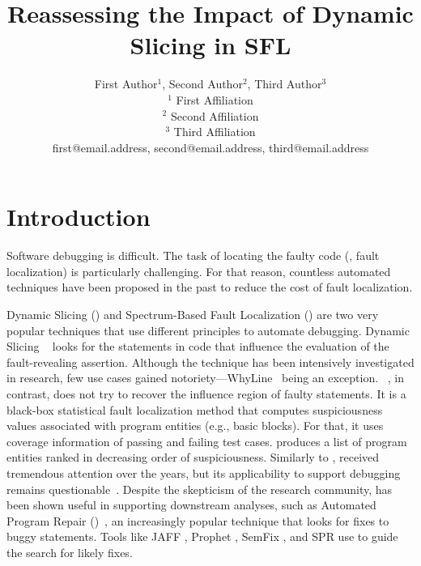\documentclass{article}
\title{Reassessing the Impact of Dynamic Slicing in SFL}
\author{
First Author$^1$,
Second Author$^2$,
Third Author$^3$
\\ 
$^1$ First Affiliation\\
$^2$ Second Affiliation\\
$^3$ Third Affiliation\\
%
first@email.address,
second@email.address,
third@email.address
}
\begin{document}
\maketitle

\begin{abstract}
\end{abstract}

\section{Introduction}


Software debugging is difficult. The task of locating the faulty code
(\ie{}, fault localization) is particularly challenging. For that
reason, countless automated techniques have been proposed in the past
to reduce the cost of fault localization.

Dynamic Slicing (\ds{}) and Spectrum-Based Fault Localization (\sfl{})
are two very popular techniques that use different principles to
automate debugging. Dynamic Slicing ~\citeauthor{Agrawal:1990:DPS:93542.93576} looks for the statements
in code that influence the evaluation of the fault-revealing
assertion. Although the technique has been intensively investigated in
research, few use cases gained notoriety---WhyLine~\cite{Ko:2008:DRA:1368088.1368130} being an
exception.  \sfl{}~\cite{7390282}, in contrast, does not try to
recover the influence region of faulty statements. It is a black-box
statistical fault localization method that computes suspiciousness
values associated with program entities (e.g., basic blocks). For
that, it uses coverage information of passing and failing test
cases. \sfl{} produces a list of program entities ranked in decreasing
order of suspiciousness. Similarly to \ds{}, \sfl{} received
tremendous attention over the years, but its applicability to support
debugging remains
questionable~\cite{ang-perez-van-deursen-rui-2017,Pearson:2017:EIF:3097368.3097441,Xie:2016:RAD:2884781.2884834}.
Despite the skepticism of the research community, \sfl{} has been
shown useful in supporting downstream analyses, such as Automated
Program Repair
(\apr{})~\cite{automatic-software-repair-survey2017,kim-etal-daghstul2017},
an increasingly popular technique that looks for fixes to buggy
statements. Tools like JAFF \cite{arcuri-2011}, Prophet
\cite{long-rinard-2016}, SemFix \cite{nguyen-qi-roychoudhury-2013},
and SPR \cite{long-rinard-2015} use \sfl{} to guide the search for
likely fixes.
\end{document}
